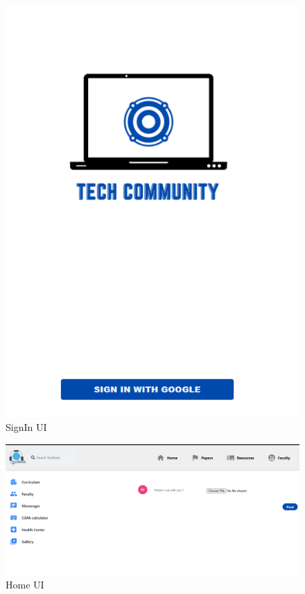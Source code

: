 \documentclass{standalone}
\begin{document}
\begin{figure}
\includegraphics{./img/img1.png} 
\caption{SignIn UI}
 \label{fig:sign}
\end{figure}

\begin{figure}
\includegraphics[scale=0.4]{./img/img2.png}
\caption{Home UI}
 \label{fig:home}
\end{figure}
\end{document}
